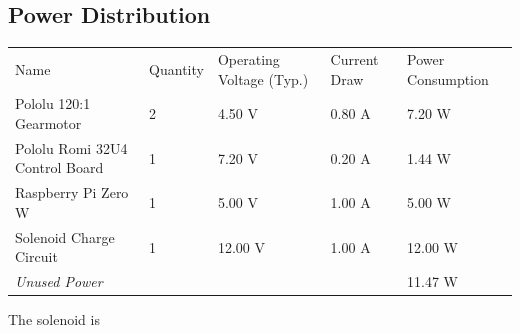 \documentclass{article}
\begin{document}
          \subsection{Power Distribution}
          \begin{table}[h]
          \begin{tabular}{lllll}
            Name                           & Quantity & Operating Voltage (Typ.) & Current Draw & Power Consumption \\
            Pololu 120:1 Gearmotor         & 2        & 4.50 V                   & 0.80 A       & 7.20 W            \\
            Pololu Romi 32U4 Control Board & 1        & 7.20 V                   & 0.20 A       & 1.44 W            \\
            Raspberry Pi Zero W            & 1        & 5.00 V                   & 1.00 A       & 5.00 W            \\
            Solenoid Charge Circuit        & 1        & 12.00 V                  & 1.00 A       & 12.00 W           \\
            \textit{Unused Power}          & \multicolumn{3}{l}{}                               & 11.47 W
          \end{tabular}
          \label{tab:power-dist}
          \end{table}
          The solenoid is
\end{document}
